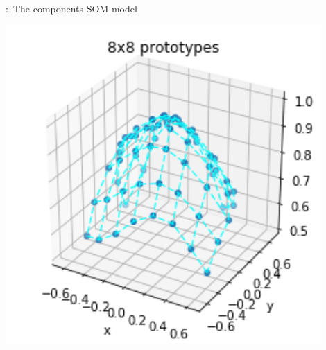 \begin{frame}{\subsecname:~The components SOM model}
{\begin{center}
\begin{minipage}{0.29\textwidth}
\end{minipage}
\begin{minipage}{0.29\textwidth}
	\includegraphics[width=0.9\textwidth]{img/3-b}
\end{minipage}
\end{center}
}


\end{frame}
